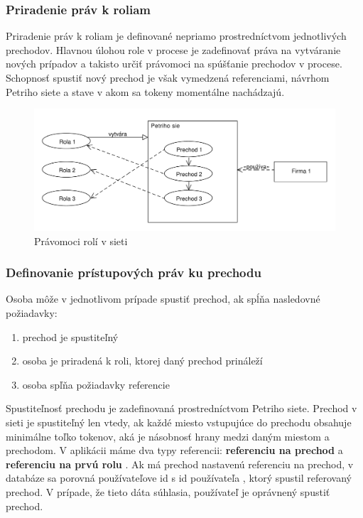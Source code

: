 \subsubsection{Priradenie práv k roliam}
Priradenie práv k roliam je definované nepriamo prostredníctvom jednotlivých prechodov. Hlavnou úlohou role v procese je zadefinovať práva na vytváranie nových prípadov a takisto určiť právomoci na spúšťanie prechodov v procese. Schopnosť spustiť nový prechod je však vymedzená referenciami, návrhom Petriho siete a stave v akom sa tokeny momentálne nachádzajú.  


\begin{figure}[h]
	\centering
	\includegraphics[width=0.9\linewidth]{images/roles_permissions}
	\caption{ Právomoci rolí v sieti }
	\label{fig:roles_permissions}
\end{figure}

\subsubsection{Definovanie prístupových práv ku prechodu}

Osoba môže v jednotlivom prípade spustiť prechod, ak spĺňa nasledovné požiadavky:
\begin{enumerate}
	\item prechod je spustiteľný
	\item osoba je priradená k roli, ktorej daný prechod prináleží
	\item osoba spľňa požiadavky referencie
\end{enumerate}

Spustiteľnosť prechodu je zadefinovaná prostredníctvom Petriho siete. Prechod v sieti je spustiteľný len vtedy, ak každé  miesto vstupujúce do prechodu obsahuje minimálne toľko tokenov, aká je násobnosť hrany medzi daným miestom a prechodom.
V aplikácii máme dva typy referencii: \textbf{referenciu na prechod} a \textbf{referenciu na prvú rolu} .
Ak má prechod nastavenú referenciu na prechod, v databáze sa porovná používateľove id s id používateľa , ktorý spustil referovaný prechod. V prípade, že tieto dáta súhlasia, používateľ je oprávnený spustiť prechod.

